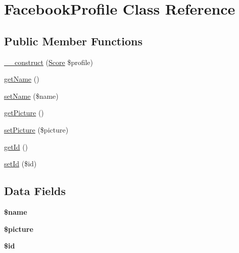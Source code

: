 \hypertarget{class_facebook_profile}{\section{Facebook\+Profile Class Reference}
\label{class_facebook_profile}
}
\subsection*{Public Member Functions}
\begin{DoxyCompactItemize}
\item 
\hyperlink{class_facebook_profile_a78901b1dca5c8d968c712cfff2ccff72}{\+\_\+\+\_\+construct} (\hyperlink{class_score}{Score} \$profile)
\item 
\hyperlink{class_facebook_profile_a3d0963e68bb313b163a73f2803c64600}{get\+Name} ()
\item 
\hyperlink{class_facebook_profile_a2fe666694997d047711d7653eca2f132}{set\+Name} (\$name)
\item 
\hyperlink{class_facebook_profile_aa10a041137b00a6f0a79916f4009924f}{get\+Picture} ()
\item 
\hyperlink{class_facebook_profile_ad822b1785ceddeb91452e90dd910d2ee}{set\+Picture} (\$picture)
\item 
\hyperlink{class_facebook_profile_a12251d0c022e9e21c137a105ff683f13}{get\+Id} ()
\item 
\hyperlink{class_facebook_profile_a87313ad678fb2a2a8efb435cf0bdb9a0}{set\+Id} (\$id)
\end{DoxyCompactItemize}
\subsection*{Data Fields}
\begin{DoxyCompactItemize}
\item 
\hypertarget{class_facebook_profile_ab2fc40d43824ea3e1ce5d86dee0d763b}{{\bfseries \$name}}\label{class_facebook_profile_ab2fc40d43824ea3e1ce5d86dee0d763b}

\item 
\hypertarget{class_facebook_profile_a6ed313adb3a8ef1daf8fafdc842b09d1}{{\bfseries \$picture}}\label{class_facebook_profile_a6ed313adb3a8ef1daf8fafdc842b09d1}

\item 
\hypertarget{class_facebook_profile_ae97941710d863131c700f069b109991e}{{\bfseries \$id}}\label{class_facebook_profile_ae97941710d863131c700f069b109991e}

\end{DoxyCompactItemize}


